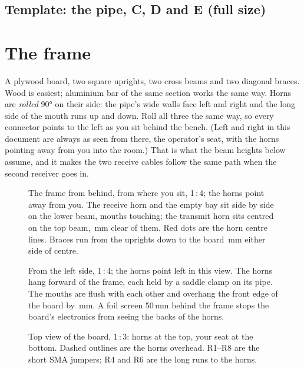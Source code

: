 \documentclass[10pt]{article}
\begin{document}
\newpage
\subsection{Template: the pipe, C, D and E (full size)}\label{tmpl:pipe}
\begin{center}

\end{center}

\newpage
\section{The frame}\label{sec:frame}

A plywood board, two square uprights, two cross beams and two diagonal braces. Wood is easiest; aluminium bar of the same section works the same way. Horns are \emph{rolled} 90° on their side: the pipe's wide walls face left and right and the long side of the mouth runs up and down. Roll all three the same way, so every connector points to the left as you sit behind the bench. (Left and right in this document are always as seen from there, the operator's seat, with the horns pointing away from you into the room.) That is what the beam heights below assume, and it makes the two receive cables follow the same path when the second receiver goes in.

\begin{figure}[H]
\centering

\caption{The frame from behind, from where you sit, 1\,:\,4; the horns point away from you. The receive horn and the empty bay sit side by side on the lower beam, mouths touching; the transmit horn sits centred on the top beam, \rowGap\,mm clear of them. Red dots are the horn centre lines. Braces run from the uprights down to the board \braceFootX\,mm either side of centre.}
\end{figure}

\newpage
\begin{figure}[H]
\centering

\caption{From the left side, 1\,:\,4; the horns point left in this view. The horns hang forward of the frame, each held by a saddle clamp on its pipe. The mouths are flush with each other and overhang the front edge of the board by \overhang\,mm. A foil screen 50\,mm behind the frame stops the board's electronics from seeing the backs of the horns.}
\end{figure}

\begin{figure}[H]
\centering

\caption{Top view of the board, 1\,:\,3: horns at the top, your seat at the bottom. Dashed outlines are the horns overhead. R1–R8 are the short SMA jumpers; R4 and R6 are the long runs to the horns.}\label{sec:plan}
\end{figure}
\end{document}

